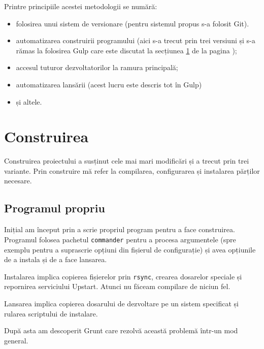 \documentclass[a4wide,12pt]{report}
\newcommand{\cod}[1]{\texttt{#1}}
\begin{document}
Printre principiile acestei metodologii se numără:

\begin{itemize}

\item folosirea unui sistem de versionare (pentru sistemul propus s-a folosit
Git).

\item automatizarea construirii programului (aici s-a trecut prin trei versiuni
și s-a rămas la folosirea Gulp care este discutat la secțiunea
\ref{construireasec} de la pagina \pageref{construireasec});

\item accesul tuturor dezvoltatorilor la ramura principală;

\item automatizarea lansării (acest lucru este descris tot în Gulp)

\item și altele.

\end{itemize}

\section{Construirea}
\label{construireasec}

Construirea proiectului a susținut cele mai mari modificări și a trecut prin
trei variante. Prin construire mă refer la compilarea, configurarea și
instalarea părților necesare.

\subsection{Programul propriu}

Inițial am început prin a scrie propriul program pentru a face construirea.
Programul folosea pachetul \cod{commander} pentru a procesa argumentele (spre
exemplu pentru a suprascrie opțiuni din fișierul de configurație) și avea
opțiunile de a instala și de a face lansarea.

Instalarea implica copierea fișierelor prin \cod{rsync}, crearea dosarelor
speciale și repornirea serviciului Upstart. Atunci nu făceam compilare de niciun
fel.

Lansarea implica copierea dosarului de dezvoltare pe un sistem specificat și
rularea scriptului de instalare.

După asta am descoperit Grunt care rezolvă această problemă într-un mod general.
\end{document}
